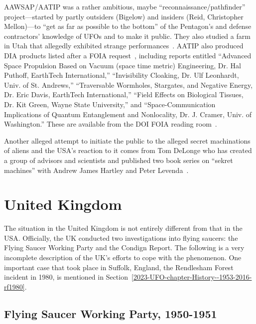 AAWSAP/AATIP was a rather ambitious, maybe ``reconnaissance/pathfinder'' project---started by partly outsiders (Bigelow) and insiders (Reid, Christopher Mellon)---to ``get as far as possible to the bottom'' of the Pentagon's and defense contractors' knowledge of UFOs and to make it public. They also studied a farm in Utah that allegedly exhibited strange performances~\cite{Lacatski-2021}. AATIP also produced DIA products listed after a FOIA request~\cite{FOIA-AATIP-2019Jan}, including reports entitled ``Advanced Space Propulsion Based on Vacuum (space time metric) Engineering, Dr. Hal Puthoff, EarthTech International,'' ``Invisibility Cloaking, Dr. Ulf Leonhardt, Univ. of St. Andrews,'' ``Traversable Wormholes, Stargates, and Negative Energy, Dr. Eric Davis, EarthTech International,'' ``Field Effects on Biological Tissues, Dr. Kit Green, Wayne State University,'' and ``Space-Communication Implications of Quantum Entanglement and Nonlocality, Dr. J. Cramer, Univ. of Washington.'' These are available from the DOI FOIA reading room~\cite{DOI-FRR2023Jan}.

Another alleged attempt to initiate the public to the alleged secret machinations of aliens and the USA's reaction to it comes from Tom DeLonge
who has created a group of advisors and scientists and published two book series on ``sekret machines'' with Andrew James Hartley and Peter Levenda~\cite{DeLongeHartley-SM1,DeLongeLevenda-Gods,DeLongeHartley-SM2,DeLongeLevenda-Men}.


\section{United Kingdom}
\label{2023-UFO-part-Perception-types-UK}


 The situation in the United Kingdom is not entirely different from that in the USA. Officially, the UK conducted two investigations into flying saucers: the Flying Saucer Working Party and the Condign Report. The following is a very incomplete description of the UK's efforts to cope with the phenomenon. One important case that took place in Suffolk, England, the Rendlesham Forest incident in 1980, is mentioned in Section~\ref{2023-UFO-chapter-History--1953-2016-rf1980}.


\subsection{Flying Saucer Working Party, 1950-1951}
\label{2023-UFO-part-Perception-types-UK-flwp1950-1}

